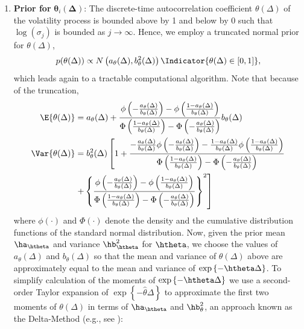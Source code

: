 \begin{enumerate}
\item \textbf{Prior for } $\boldsymbol{\theta}_i(\boldsymbol{\Delta})$: The discrete-time autocorrelation coefficient $\theta(\Delta)$ of the volatility process is bounded above by 1 and below by 0 such that $\log(\sigma_j)$ is bounded as $j \to \infty$.  Hence, we employ a truncated normal prior for $\theta(\Delta)$,
$$
p(\theta(\Delta)) \propto N\left(a_{\theta}(\Delta), b^2_{\theta}(\Delta) \right) \Indicator{\theta(\Delta) \in [0,1]},
$$
which leads again to a tractable computational algorithm. Note that because of the truncation,
\begin{align}
\E{\theta(\Delta)} &= a_{\theta}(\Delta) + \frac{ \phi\left( -\frac{a_{\theta}(\Delta)}{b_{\theta}(\Delta)} \right) - \phi\left(\frac{1- a_{\theta}(\Delta)}{b_{\theta}(\Delta)} \right)}{\Phi\left( \frac{1- a_{\theta}(\Delta) }{b_{\theta}(\Delta)} \right) - \Phi\left( -\frac{a_{\theta}(\Delta)}{b_{\theta}(\Delta)} \right)}  b_{\theta}(\Delta)  \label{eq:meantheta1} \\
\Var{\theta(\Delta)} &= b^2_{\theta}(\Delta)  \left[ 1 + \frac{ -\frac{a_{\theta}(\Delta)}{b_{\theta}(\Delta)}\phi\left( -\frac{a_{\theta}(\Delta)}{b_{\theta}(\Delta)} \right) - \frac{1- a_{\theta}(\Delta)}{b_{\theta}(\Delta)}\phi\left(\frac{1- a_{\theta}(\Delta)}{b_{\theta}(\Delta)} \right)}{\Phi\left( \frac{1- a_{\theta}(\Delta) }{b_{\theta}(\Delta)} \right) - \Phi\left( -\frac{a_{\theta}(\Delta)}{b_{\theta}(\Delta)} \right)}   \right.  \nonumber \\ &      \left.
%
+\left\{ \frac{ \phi\left( -\frac{a_{\theta}(\Delta)}{b_{\theta}(\Delta)} \right) - \phi\left(\frac{1- a_{\theta}(\Delta)}{b_{\theta}(\Delta)} \right)}{\Phi\left( \frac{1- a_{\theta}(\Delta) }{b_{\theta}(\Delta)} \right) - \Phi\left( -\frac{a_{\theta}(\Delta)}{b_{\theta}(\Delta)} \right)} \right\}^2    \label{eq:vartheta1}
\right]
\end{align}
where $\phi(\cdot)$ and $\Phi(\cdot)$ denote the density and the cumulative distribution functions of the standard normal distribution.  Now, given the prior mean $\ha_{\htheta}$ and variance $\hb^2_{\htheta}$ for $\htheta$, we choose the values of $a_{\theta}(\Delta)$ and $b_{\theta}(\Delta)$ so that the mean and variance of $\theta(\Delta)$ above are approximately equal to the mean and variance of $\exp\left\{ -\htheta \Delta \right\}$. To simplify calculation of the moments of $\exp\left\{ -\htheta \Delta \right\}$ we use a second-order Taylor expansion of $\exp\left\{ -\hat{\theta} \Delta \right\}$ to approximate the first two moments of $\theta(\Delta)$ in terms of $\ha_{\htheta}$ and $\hb^2_{\theta}$, an approach known as the Delta-Method (e.g., see \cite{casella2002statistical}):

\end{enumerate}
